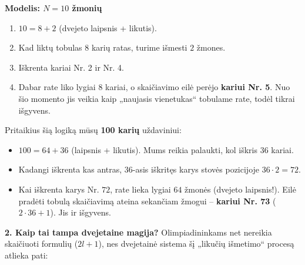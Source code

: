 \documentclass[11pt,a4paper]{scrartcl}
\newenvironment{solution}
    {\begin{list}{}{\setlength{\leftmargin}{10pt}\setlength{\rightmargin}{10pt}}\item[]}
    {\end{list}}
\begin{document}
\begin{solution}
\begin{minipage}{0.45\textwidth}
\begin{center}
\end{center}
\end{minipage}
\hfill
\begin{minipage}{0.5\textwidth}
\textbf{Modelis: $N = 10$ žmonių}
\begin{enumerate}
    \item $10 = 8 + 2$ (dvejeto laipsnis + likutis).
    \item Kad liktų tobulas $8$ karių ratas, turime išmesti $2$ žmones.
    \item Iškrenta kariai Nr. 2 ir Nr. 4.
    \item Dabar rate liko lygiai $8$ kariai, o skaičiavimo eilė perėjo \textbf{kariui Nr. 5}. Nuo šio momento jis veikia kaip „naujasis vienetukas“ tobulame rate, todėl tikrai išgyvens.
\end{enumerate}
\end{minipage}
\vspace{0.5cm}

Pritaikius šią logiką mūsų \textbf{100 karių} uždaviniui:
\begin{itemize}
    \item $100 = 64 + 36$ (laipsnis + likutis). Mums reikia palaukti, kol iškris $36$ kariai.
    \item Kadangi iškrenta kas antras, 36-asis iškritęs karys stovės pozicijoje $36 \cdot 2 = 72$.
    \item Kai iškrenta karys Nr. $72$, rate lieka lygiai $64$ žmonės (dvejeto laipsnis!). Eilė pradėti tobulą skaičiavimą ateina sekančiam žmogui – \textbf{kariui Nr. 73} ($2 \cdot 36 + 1$). Jis ir išgyvens.
\end{itemize}

\textbf{2. Kaip tai tampa dvejetaine magija?}
Olimpiadininkams net nereikia skaičiuoti formulių ($2l+1$), nes dvejetainė sistema šį „likučių išmetimo“ procesą atlieka pati:


\end{solution}
\end{document}
